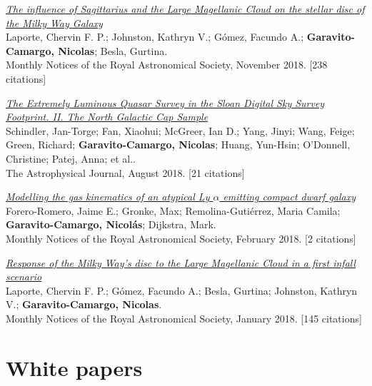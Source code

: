 \documentclass[14pt]{article}
\begin{document}
\begin{etaremune}
\item \textit{\href{https://ui.adsabs.harvard.edu/abs/2018MNRAS.481..286L/abstract}{The influence of Sagittarius and the Large Magellanic Cloud on the stellar disc of the Milky Way Galaxy}}\\
  {\small \color{darkgray} Laporte, Chervin F. P.; Johnston, Kathryn V.; Gómez, Facundo A.; \textbf{Garavito-Camargo, Nicolas}; Besla, Gurtina.\\
  Monthly Notices of the Royal Astronomical Society, November 2018. [238 citations]}

\item \textit{\href{https://ui.adsabs.harvard.edu/abs/2018ApJ...863..144S/abstract}{The Extremely Luminous Quasar Survey in the Sloan Digital Sky Survey Footprint. II. The North Galactic Cap Sample}}\\
  {\small \color{darkgray} Schindler, Jan-Torge; Fan, Xiaohui; McGreer, Ian D.; Yang, Jinyi; Wang, Feige; Green, Richard; \textbf{Garavito-Camargo, Nicolas}; Huang, Yun-Hsin; O'Donnell, Christine; Patej, Anna; et al..\\
  The Astrophysical Journal, August 2018. [21 citations]}

\item \textit{\href{https://ui.adsabs.harvard.edu/abs/2018MNRAS.474...12F/abstract}{Modelling the gas kinematics of an atypical Ly $\alpha$ emitting compact dwarf galaxy}}\\
  {\small \color{darkgray} Forero-Romero, Jaime E.; Gronke, Max; Remolina-Gutiérrez, Maria Camila; \textbf{Garavito-Camargo, Nicolás}; Dijkstra, Mark.\\
  Monthly Notices of the Royal Astronomical Society, February 2018. [2 citations]}

\item \textit{\href{https://ui.adsabs.harvard.edu/abs/2018MNRAS.473.1218L/abstract}{Response of the Milky Way's disc to the Large Magellanic Cloud in a first infall scenario}}\\
  {\small \color{darkgray} Laporte, Chervin F. P.; Gómez, Facundo A.; Besla, Gurtina; Johnston, Kathryn V.; \textbf{Garavito-Camargo, Nicolas}.\\
  Monthly Notices of the Royal Astronomical Society, January 2018. [145 citations]}

\end{etaremune}

\section*{White papers}
\end{document}
